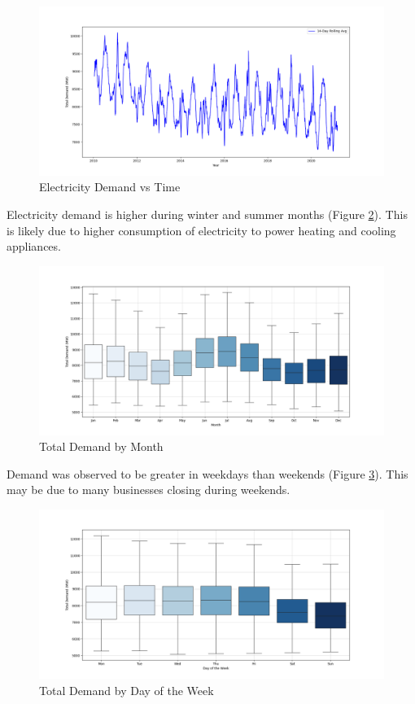 \documentclass[mstat,12pt]{unswthesis}
\begin{document}
\begin{figure}
\includegraphics[width=1\linewidth,height=0.4\textheight]{images/demandvtime} \caption{Electricity Demand vs Time}\label{fig:yeardemand}
\end{figure}

Electricity demand is higher during winter and summer months (Figure \ref{fig:monthdemand}). This is likely due to higher consumption of electricity to power heating and cooling appliances.

\begin{figure}
\includegraphics[width=1\linewidth,height=0.4\textheight]{images/demandMonth} \caption{Total Demand by Month}\label{fig:monthdemand}
\end{figure}

Demand was observed to be greater in weekdays than weekends (Figure \ref{fig:weekdemand}). This may be due to many businesses closing during weekends.

\begin{figure}
\includegraphics[width=1\linewidth,height=0.4\textheight]{images/WeekDemand} \caption{Total Demand by Day of the Week}\label{fig:weekdemand}
\end{figure}
\end{document}
